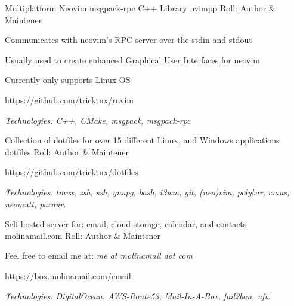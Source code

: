 

\begin{cventries}

	\cventry
		{Multiplatform Neovim msgpack-rpc C++ Library} %
		{nvimpp} %
		{} %
		{Roll: Author \& Maintener} %
		{
			\begin{cvitems} %
				\item {Communicates with neovim's RPC server over the stdin and stdout}
				\item {Usually used to create enhanced Graphical User Interfaces for neovim}
				\item {Currently only supports Linux OS}
				\item {https://github.com/tricktux/rnvim}
				\item {\it{Technologies:} C++, CMake, msgpack, msgpack-rpc}
			\end{cvitems}
		}

  \cventry
		{Collection of dotfiles for over 15 different Linux, and Windows applications} %
    {dotfiles} %
    {} %
		{Roll: Author \& Maintener} %
    {
      \begin{cvitems} %
				\item {https://github.com/tricktux/dotfiles}
				\item {\it{Technologies:} tmux, zsh, ssh, gnupg, bash, i3wm, git, (neo)vim, polybar, cmus, neomutt, pacaur.}
      \end{cvitems}
    }
	\cventry
		{Self hosted server for: email, cloud storage, calendar, and contacts} %
		{molinamail.com} %
		{} %
		{Roll: Author \& Maintener} %
		{
			\begin{cvitems} %
			\item {Feel free to email me at: \it{me at molinamail dot com}}
			\item {https://box.molinamail.com/email}
			\item {\it{Technologies:} DigitalOcean, AWS-Route53, Mail-In-A-Box, fail2ban, ufw }
			\end{cvitems}
		}

\end{cventries}
